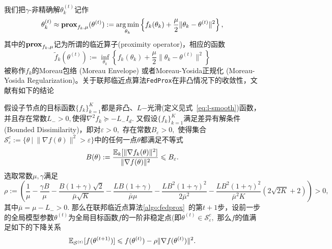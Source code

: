 我们把$\gamma$-非精确解$\theta_k^{(t)}$记作
\begin{equation}
\label{eq:prox-op}
\theta_k^{(t)} \approx \mathbf{prox}_{f_k, \mu} (\theta^{(t)}) := \operatorname*{arg\,min}\limits_{\theta_k} \left\{ f_k(\theta_k) + \frac{\mu}{2} \lVert \theta_k - \theta^{(t)} \rVert^2 \right\},
\end{equation}
其中的$\mathbf{prox}_{f_k, \mu}$记为所谓的临近算子(proximity operator)，相应的函数
\begin{equation}
\label{eq:moreau_env}
\tilde{f}_k (\theta^{(t)}) := \inf\limits_{\theta_k} \left\{ f_k(\theta_k) + \frac{\mu}{2} \lVert \theta_k - \theta^{(t)} \rVert^2 \right\}
\end{equation}
被称作$f_k$的Moreau包络 (Moreau Envelope) 或者Moreau-Yosida正规化 (Moreau-Yosida Regularization)。关于联邦临近点算法\texttt{FedProx}在非凸情况下的收敛性，文献\parencite{sahu2018fedprox}有如下的结论
\begin{theorem}
\label{thm:fedprox}
假设子节点的目标函数$\{f_k\}_{k=1}^K$都是非凸、$L$−光滑(定义见式~\eqref{eq:l-smooth})函数，并且存在常数$L_- > 0,$使得$\nabla^2 f_k \succcurlyeq -L_- I_d.$ 又假设$\{f_k\}_{k=1}^K$满足差异有解条件(Bounded Dissimilarity)，即对$\varepsilon > 0,$ 存在常数$B_{\varepsilon} > 0,$ 使得集合$\mathcal{S}_{\varepsilon}^c := \{ \theta ~|~ \lVert \nabla f(\theta) \rVert^2 > \varepsilon\}$中的任何一点$\theta$都满足不等式
\begin{equation}
\label{eq:fedprox_bdd_dissim}
B(\theta) := \frac{\operatorname*{\mathbb{E}}_k [\lVert \nabla f_k(\theta) \rVert^2]}{\lVert \nabla f(\theta) \rVert^2} \leqslant B_{\varepsilon}.
\end{equation}
选取常数$\mu, \gamma$满足
\begin{equation*}
\rho := \left( \frac{1}{\mu} - \frac{\gamma B}{\mu} - \frac{B(1+\gamma)\sqrt{2}}{\bar{\mu}\sqrt{K}} - \frac{LB(1+\gamma)}{\bar{\mu}\mu} - \frac{LB^2(1+\gamma)^2}{2\bar{\mu}^2} - \frac{LB^2(1+\gamma)^2}{\bar{\mu}^2 K} \left( 2\sqrt{2K} + 2 \right) \right) > 0,
\end{equation*}
其中$\bar{\mu} = \mu - L_- > 0.$ 那么在联邦临近点算法\ref{algo:fedprox}~的第$t+1$步，设前一步的全局模型参数$\theta^{(t)}$为全局目标函数$f$的一阶非稳定点(即$\theta^{(t)} \in \mathcal{S}_{\varepsilon}^c,$ 那么$f$的值满足如下的下降关系
\begin{equation*}
\operatorname*{\mathbb{E}}\nolimits_{\mathcal{S}^{(t)}}[f(\theta^{(t+1)})] \leqslant f(\theta^{(t)}) - \rho \lVert \nabla f (\theta^{(t)}) \rVert^2.
\end{equation*}
\end{theorem}


